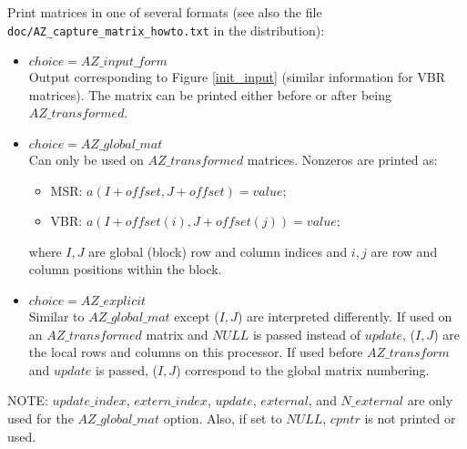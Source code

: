 



\vspace{2em}
{ \hrulefill}
\vspace{1em}

Print \Az{} matrices in one of several formats (see also the file 
\verb'doc/AZ_capture_matrix_howto.txt' in the \Az{} distribution):
\begin{itemize}
\item $choice = AZ\_input\_form$ \\
  Output corresponding to Figure \ref{init_input} (similar information for VBR
  matrices). The matrix can be printed either before or after being
  $AZ\_transformed$.
\item $choice = AZ\_global\_mat$ \\
  Can only be used on $AZ\_transformed$ matrices. Nonzeros are printed as:
  \begin{itemize}
  \item MSR: $a(I + offset ,J + offset) = value;$
  \item VBR: $a(I + offset (i) , J + offset (j) ) = value;$
  \end{itemize}
  where $I,J$ are global (block) row and column indices and $i,j$ are row and
  column positions within the block.
\item $choice = AZ\_explicit$ \\
  Similar to $AZ\_global\_mat$ except ($I,J$) are interpreted differently. If
  used on an $AZ\_transformed$ matrix and $NULL$ is passed instead of $update$,
  ($I,J$) are the local rows and columns on this processor. If used before
  $AZ\_transform$ and $update$ is passed, ($I,J$) correspond to the global
  matrix numbering.
\end{itemize}
NOTE: $update\_index$, $extern\_index$, $update$, $external$, and $N\_external$
are only used for the $AZ\_global\_mat$ option.  Also, if set to $NULL$,
$cpntr$ is not printed or used.

